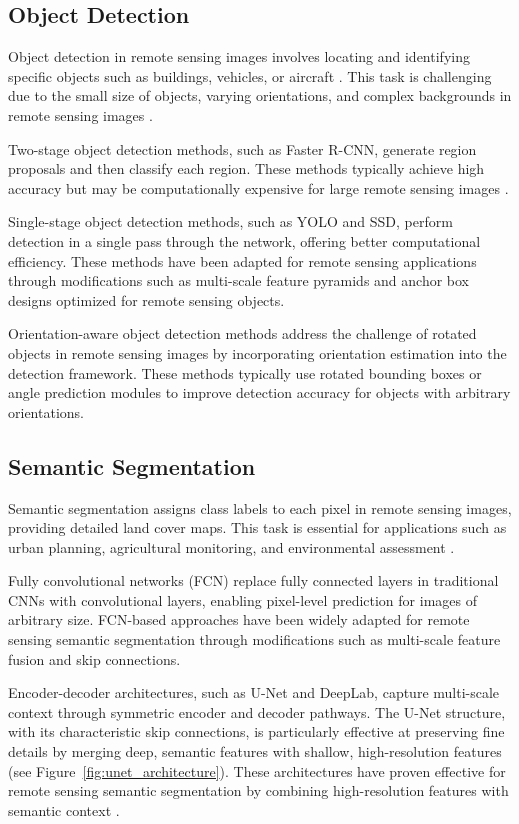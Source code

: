 \documentclass[12pt,a4paper]{article}
\begin{document}
\subsection{Object Detection}
Object detection in remote sensing images involves locating and identifying specific objects such as buildings, vehicles, or aircraft \cite{cheng2016survey}. This task is challenging due to the small size of objects, varying orientations, and complex backgrounds in remote sensing images \cite{zhang2016weakly}.

Two-stage object detection methods, such as Faster R-CNN, generate region proposals and then classify each region. These methods typically achieve high accuracy but may be computationally expensive for large remote sensing images \cite{deng2017enhanced}.

Single-stage object detection methods, such as YOLO and SSD, perform detection in a single pass through the network, offering better computational efficiency. These methods have been adapted for remote sensing applications through modifications such as multi-scale feature pyramids and anchor box designs optimized for remote sensing objects.

Orientation-aware object detection methods address the challenge of rotated objects in remote sensing images by incorporating orientation estimation into the detection framework. These methods typically use rotated bounding boxes or angle prediction modules to improve detection accuracy for objects with arbitrary orientations.

\subsection{Semantic Segmentation}
Semantic segmentation assigns class labels to each pixel in remote sensing images, providing detailed land cover maps. This task is essential for applications such as urban planning, agricultural monitoring, and environmental assessment \cite{maggiori2017end}.

Fully convolutional networks (FCN) replace fully connected layers in traditional CNNs with convolutional layers, enabling pixel-level prediction for images of arbitrary size. FCN-based approaches have been widely adapted for remote sensing semantic segmentation through modifications such as multi-scale feature fusion and skip connections.

Encoder-decoder architectures, such as U-Net and DeepLab, capture multi-scale context through symmetric encoder and decoder pathways. The U-Net structure, with its characteristic skip connections, is particularly effective at preserving fine details by merging deep, semantic features with shallow, high-resolution features (see Figure~\ref{fig:unet_architecture}). These architectures have proven effective for remote sensing semantic segmentation by combining high-resolution features with semantic context \cite{liu2019learning}.
\end{document}
